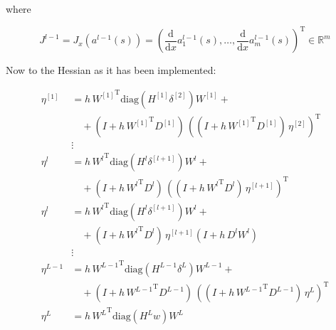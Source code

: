 where 

\begin{equation*}
    J^{l-1} = J_x(a^{l-1}(s)) = \left( \frac{\mathrm{d}}{\mathrm{d} x} a^{l-1}_1(s), \ldots, \frac{\mathrm{d}}{\mathrm{d} x} a^{l-1}_m(s) \right)^{\mathrm{T}} \in \mathbb{R}^{m}
\end{equation*}


Now to the Hessian as it has been implemented: 

\begin{align*}
    \eta^{[1]} & = h \, {W^{[1]}}^{\mathrm{T}} \mathrm{diag} \left( H^{[1]} \delta^{[2]} \right) W^{[1]} + \\
    & \quad + \left( I + h \, {W^{[1]}}^{\mathrm{T}} D^{[1]} \right) \, \left( \left( I + h \, {W^{[1]}}^{\mathrm{T}} D^{[1]} \right) \, \eta^{[2]} \right)^{\mathrm{T}} \\ 
    &\vdots\\
    \eta^{l} & = h \, {W^{l}}^{\mathrm{T}} \mathrm{diag} \left( H^{l} \delta^{[l+1]} \right) W^{l} + \\
    & \quad + \left( I + h \, {W^{l}}^{\mathrm{T}} D^{l} \right) \, \left( \left( I + h \, {W^{l}}^{\mathrm{T}} D^{l} \right) \, \eta^{[l+1]} \right)^{\mathrm{T}} \\ 
    \eta^{l} & = h \, {W^{l}}^{\mathrm{T}} \mathrm{diag} \left( H^{l} \delta^{[l+1]} \right) W^{l} + \\
    & \quad + \left( I + h \, {W^{l}}^{\mathrm{T}} D^{l} \right) \, \eta^{[l+1]}  \left( I + h \,  D^{l} {W^{l}} \right) \\ 
    &\vdots\\
    \eta^{L-1} & = h \, {W^{L-1}}^{\mathrm{T}} \mathrm{diag} \left( H^{L-1} \delta^{L} \right) W^{L-1} + \\
    & \quad + \left( I + h \, {W^{L-1}}^{\mathrm{T}} D^{L-1} \right) \, \left( \left( I + h \, {W^{L-1}}^{\mathrm{T}} D^{L-1} \right) \, \eta^{L} \right)^{\mathrm{T}} \\
    \eta^{L} &  = h \, {W^{L}}^{\mathrm{T}} \mathrm{diag}(H^{L} w) W^{L} 
\end{align*}

